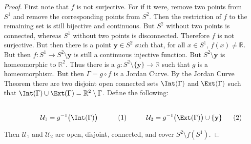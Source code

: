 \documentclass[crop=false,class=book,oneside]{standalone}                      %
\begin{document}
            \begin{proof}
                First note that $f$ is not surjective. For if it were,
                remove two points from $S^{1}$ and remove the corresponding
                points from $S^{2}$. Then the restriction of $f$ to the
                remaining set is still bijective and continuous. But
                $S^{2}$ without two points is connected, whereas $S^{1}$
                without two points is disconnected. Therefore $f$ is not
                surjective. But then there is a point $\mathbf{y}\in{S}^{2}$
                such that, for all $x\in{S}^{1}$, $f(x)\ne\mathbb{R}$.
                But then $f:S^{1}\rightarrow{S}^{2}\setminus\mathbf{y}$
                is still a continuous injective function. But
                $S^{2}\setminus\mathbf{y}$ is homeomorphic to $\mathbb{R}^{2}$.
                Thus there is a
                $g:S^{2}\setminus\{\mathbf{y}\}\rightarrow\mathbb{R}$
                such that $g$ is a homeomorphism. But then $\Gamma=g\circ{f}$
                is a Jordan Curve. By the Jordan Curve Theorem there are two
                disjoint open connected sets $\Int(\Gamma)$ and $\Ext(\Gamma)$
                such that
                $\Int(\Gamma)\cup\Ext(\Gamma)=\mathbb{R}^{2}\setminus\Gamma$.
                Define the following:
                \par
                \begin{subequations}
                    \begin{minipage}[b]{0.49\textwidth}
                        \centering
                        \begin{equation}
                            \mathcal{U}_{1}=g^{-1}\big(\Int(\Gamma)\big)
                        \end{equation}
                    \end{minipage}
                    \hfill
                    \begin{minipage}[b]{0.49\textwidth}
                        \begin{equation}
                            \mathcal{U}_{2}
                            =g^{-1}\big(\Ext(\Gamma)\big)\cup\{\mathbf{y}\}
                        \end{equation}
                    \end{minipage}
                \end{subequations}
                \par\hfill\par
                Then $\mathcal{U}_{1}$ and $\mathcal{U}_{2}$ are open, disjoint,
                connected, and cover $S^{2}\setminus{f}(S^{1})$.
            \end{proof}
\end{document}
